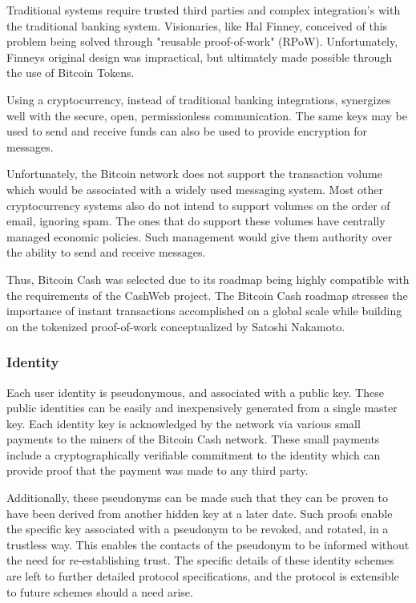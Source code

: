 \documentclass{article}
\begin{document}
Traditional systems require trusted third parties and complex integration's with the traditional banking system. Visionaries, like Hal Finney, conceived of this problem being solved through "reusable proof-of-work" (RPoW). Unfortunately, Finneys original design was impractical, but ultimately made possible through the use of Bitcoin Tokens.

Using a cryptocurrency, instead of traditional banking integrations, synergizes well with the secure, open, permissionless communication. The same keys may be used to send and receive funds can also be used to provide encryption for messages.

Unfortunately, the Bitcoin network does not support the transaction volume which would be associated with a widely used messaging system. Most other cryptocurrency systems also do not intend to support volumes on the order of email, ignoring spam. The ones that do support these volumes have centrally managed economic policies. Such management would give them authority over the ability to send and receive messages.

Thus, Bitcoin Cash was selected due to its roadmap being highly compatible with the requirements of the CashWeb project. The Bitcoin Cash roadmap stresses the importance of instant transactions accomplished on a global scale while building on the tokenized proof-of-work conceptualized by Satoshi Nakamoto.

\subsubsection{Identity}

Each user identity is pseudonymous, and associated with a public key. These public identities can be easily and inexpensively generated from a single master key. Each identity key is acknowledged by the network via various small payments to the miners of the Bitcoin Cash network. These small payments include a cryptographically verifiable commitment to the identity which can provide proof that the payment was made to any third party.

Additionally, these pseudonyms can be made such that they can be proven to have been derived from another hidden key at a later date. Such proofs enable the specific key associated with a pseudonym to be revoked, and rotated, in a trustless way. This enables the contacts of the pseudonym to be informed without the need for re-establishing trust. The specific details of these identity schemes are left to further detailed protocol specifications, and the protocol is extensible to future schemes should a need arise.
\end{document}
